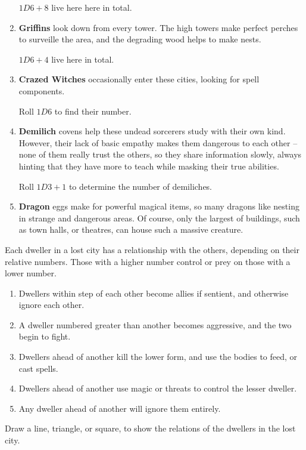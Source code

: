 \begin{multicols}{2}
\begin{enumerate}
  $1D6+8$ live here here in total.
  \item
  \textbf{Griffins} look down from every tower.
  The high towers make perfect perches to surveille the area, and the degrading wood helps to make nests.

  $1D6+4$ live here in total.
  \item
  \textbf{Crazed Witches} occasionally enter these cities, looking for spell components.

  Roll $1D6$ to find their number.
  \item
  \textbf{Demilich} covens help these undead sorcerers study with their own kind.
  However, their lack of basic empathy makes them dangerous to each other -- none of them really trust the others, so they share information slowly, always hinting that they have more to teach while masking their true abilities.

  Roll $1D3 + 1$ to determine the number of demiliches.
  \item
  \textbf{Dragon} eggs make for powerful magical items, so many dragons like nesting in strange and dangerous areas.
  Of course, only the largest of buildings, such as town halls, or theatres, can house such a massive creature.
\end{enumerate}


Each dweller in a lost city has a relationship with the others, depending on their relative numbers.
Those with a higher number control or prey on those with a lower number.

\begin{enumerate}
  \item
  Dwellers within  step of each other become allies if sentient, and otherwise ignore each other.
  \item
  A dweller numbered  greater than another becomes aggressive, and the two begin to fight.
  \item
  Dwellers  ahead of another kill the lower form, and use the bodies to feed, or cast spells.
  \item
  Dwellers  ahead of another use magic or threats to control the lesser dweller.
  \item
  Any dweller  ahead of another will ignore them entirely.
\end{enumerate}

Draw a line, triangle, or square, to show the relations of the dwellers in the lost city.


\end{multicols}
